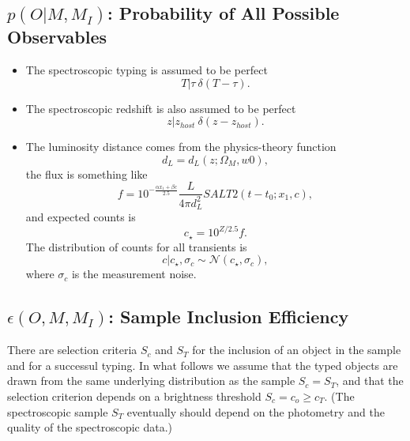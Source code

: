 \documentclass[preprint,3p]{elsarticle}
\begin{document}
\subsection{$p(O| M, M_I)$: Probability of All Possible Observables}
\begin{itemize}
\item The spectroscopic typing is assumed to be perfect
\begin{equation}
T | \tau ~ \delta (T-\tau).
\end{equation}

\item The spectroscopic redshift is also assumed to be perfect
\begin{equation}
z | z_{host} ~ \delta (z-z_{host}).
\end{equation}
\item  The luminosity distance comes from the physics-theory function
\begin{equation}
d_L = d_L(z; \Omega_M, w0),
\end{equation}
the flux is something like
\begin{equation}
f = 10^{-\frac{\alpha x_1 + \beta c}{2.5}}\frac{L}{4\pi d_L^2} SALT2(t-t_0; x_1, c),
\end{equation}
and expected counts is
\begin{equation}
c_\star = 10^{Z/2.5}f.
\end{equation}
The distribution of counts for all transients is 
\begin{equation}
c | c_\star, \sigma_c \sim \mathcal{N}(c_\star, \sigma_c),
\end{equation}
where $\sigma_c$ is the measurement noise.

\end{itemize}

\subsection{$\epsilon(O, M, M_I)$: Sample Inclusion Efficiency}

There are selection criteria $S_c$ and $S_T$ for the inclusion of an object in the
sample and for a successul typing.
In what follows we assume that the typed objects are drawn from the same underlying
distribution as the sample $S_c=S_T$, and that the selection criterion depends on a  brightness
threshold $S_c = c_o \ge c_T$.  (The spectroscopic sample $S_T$ 
eventually should depend on the
photometry and the quality of the spectroscopic data.)
\end{document}
